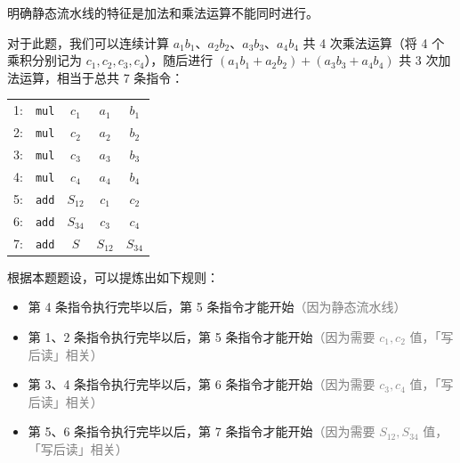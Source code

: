 \documentclass[UTF8]{ctexart}
\newcommand\Emph[1]{\colorbox{green!10}{\textcolor{green!30!black}{#1}}}
\begin{document}
明确静态流水线的特征是\Emph{加法和乘法运算不能同时进行}。

对于此题，我们可以连续计算 $a_1b_1$、$a_2b_2$、$a_3b_3$、$a_4b_4$ 共 4 次乘法运算（将 4 个乘积分别记为 $c_1,c_2,c_3,c_4$），随后进行 $(a_1b_1 + a_2b_2) + (a_3b_3 + a_4b_4)$ 共 3 次加法运算，相当于总共 7 条指令：

\begin{table}[htb]
    \centering
    \begin{tabular}{ccccc}
        1: & \verb|mul| & $c_1$ & $a_1$ & $b_1$ \\
        2: & \verb|mul| & $c_2$ & $a_2$ & $b_2$ \\
        3: & \verb|mul| & $c_3$ & $a_3$ & $b_3$ \\
        4: & \verb|mul| & $c_4$ & $a_4$ & $b_4$ \\
        5: & \verb!add! & $S_{12}$ & $c_1$ & $c_2$ \\
        6: & \verb!add! & $S_{34}$ & $c_3$ & $c_4$ \\
        7: & \verb!add! & $S$ & $S_{12}$ & $S_{34}$ \\
    \end{tabular}
\end{table}

根据本题题设，可以提炼出如下规则：
\begin{itemize}
    \item 第 4 条指令执行完毕以后，第 5 条指令才能开始\textcolor{gray}{（因为静态流水线）}
    \item 第 1、2 条指令执行完毕以后，第 5 条指令才能开始\textcolor{gray}{（因为需要 $c_1,c_2$ 值，「写后读」相关）}
    \item 第 3、4 条指令执行完毕以后，第 6 条指令才能开始\textcolor{gray}{（因为需要 $c_3,c_4$ 值，「写后读」相关）}
    \item 第 5、6 条指令执行完毕以后，第 7 条指令才能开始\textcolor{gray}{（因为需要 $S_{12},S_{34}$ 值，「写后读」相关）}
\end{itemize}
\end{document}
